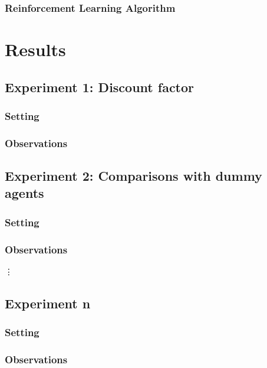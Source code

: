 \documentclass[11pt]{article}
\begin{document}
\subsubsection{Reinforcement Learning Algorithm}




\section{Results}

\subsection{Experiment 1: Discount factor}

\subsubsection{Setting}

\subsubsection{Observations}

\subsection{Experiment 2: Comparisons with dummy agents}

\subsubsection{Setting}

\subsubsection{Observations}

\vdots

\subsection{Experiment n}

\subsubsection{Setting}

\subsubsection{Observations}
\end{document}
